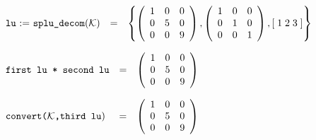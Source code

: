 \begin{flushleft}  
\hspace*{0.1in}
\begin{math}  
\begin{array}{cccc}
${\tt lu} := {\tt splu\_decom}$({\cal K}) & = & 
\left\{ 
        \left( \begin{array}{ccc} 1 & 0 & 0 \\ 0 & 5 & 0 \\ 0 & 0 & 9 \end{array} \right), 
        \left( \begin{array}{ccc} 1 & 0 & 0 \\ 0 & 1 & 0 \\ 0 & 0 & 1 
\end{array} \right), 
	[\; 1 \; 2 \; 3 \; ]
\right\} 
\end{array}
\end{math}  
\end{flushleft}

\vspace*{0.1in}

\begin{flushleft}  
\hspace*{0.1in}
\begin{math}  
\begin{array}{ccc}
${\tt first lu * second lu}$ & = & 
        \left( \begin{array}{ccc} 1 & 0 & 0 \\ 0 & 5 & 0 \\ 0 & 0 & 9
 \end{array} \right) 
\end{array}
\end{math}  
\end{flushleft}

\begin{flushleft}  
\hspace*{0.1in}
\begin{math}  
\begin{array}{ccc}
${\tt convert(${\cal K}$,third lu}$) \hspace*{0.055in} & = & 
        \left( \begin{array}{ccc} 1 & 0 & 0 \\ 0 & 5 & 0 \\ 0 & 0 & 9
 \end{array} \right) 
\end{array}
\end{math}  
\end{flushleft}


